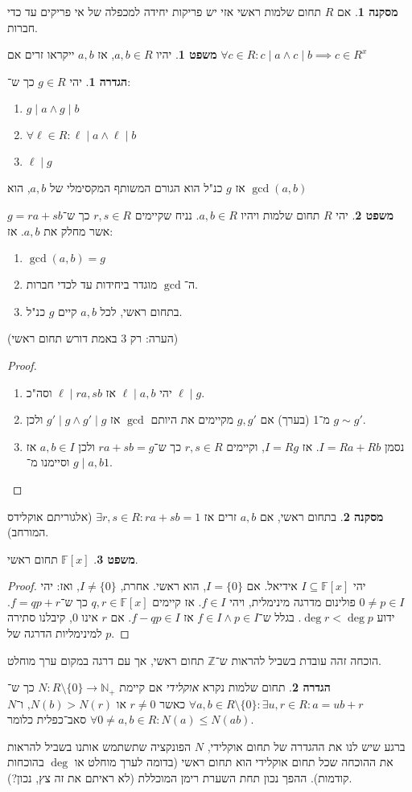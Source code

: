 \documentclass[a4paper]{article}
\newcommand\N     {\mathbb{N}}
\newcommand\Z     {\mathbb{Z}}
\newcommand\ml    {\ell}
\newcommand\F         {\mathbb{F}}
\newcommand\co        {\colon}
\theoremstyle{definition}
\newtheorem{Theorem}{משפט}
\newtheorem{definition}{הגדרה}
\newtheorem{Collary}{מסקנה}
\newcommand\cola [1] {\begin{Collary}#1\end{Collary}}
\newcommand\theo  [1] {\begin{Theorem}#1\end{Theorem}}
\newcommand\defi  [1] {\begin{definition}#1\end{definition}}
\begin{document}
	\cola{אם $R$ תחום שלמות ראשי אזי יש פריקות יחידה למכפלה של אי פריקים עד כדי חברות. }
	
	\theo{יהיו $a, b \in R$, אז $a, b$ ייקראו זרים אם $\forall c \in R\co c \mid a \land c \mid b \implies c \in R^x$}
	\defi{יהי $g \in R$ כך ש־:
		\begin{enumerate}
			\item $g \mid a \land g \mid b$
			\item $\forall \ml \in R \co \ml \mid a \land \ml \mid b$
			\item $\ml \mid g$
		\end{enumerate}
		אז $g$ כנ"ל הוא הגורם המשותף המקסימלי של $a, b$, הוא $\gcd(a, b)$}
	
	\theo{יהי $R$ תחום שלמות ויהיו $a, b \in R$. נניח שקיימים $r, s \in R$ כך ש־$g = ra + sb$ אשר מחלק את $a, b$. אז: 
		\begin{enumerate}
			\item $\gcd(a, b) = g$
			\item ה־$\gcd$ מוגדר ביחידות עד לכדי חברות. 
			\item בתחום ראשי, לכל $a, b$ קיים $g$ כנ"ל. 
	\end{enumerate}}
	(הערה: רק 3 באמת דורש תחום ראשי)
	\begin{proof}\,
		\begin{enumerate}
			\item יהי $\ml \mid a, b$ אז $\ml \mid ra, sb$ וסה"כ $\ml \mid g$. 
			\item מ־1 (בערך) אם $g, g'$ מקיימים את היותם $\gcd$ אז $g' \mid g \land g' \mid g$ ולכן $g \sim g'$. 
			\item נסמן $I = Ra + Rb$. אז $I = Rg$, וקיימים $r, s \in R$ כך ש־$ra + sb = g$ ולכן $a, b \in I$ אז $g \mid a, b$ וסיימנו מ־$1$. 
		\end{enumerate}
	\end{proof}
	\cola{בתחום ראשי, אם $a, b$ זרים אז $\exists r, s \in R\co ra + sb = 1$ (אלגוריתם אוקלידס המורחב). }
	\theo{$\F[x]$ תחום ראשי. }
	\begin{proof}
		יהי $I \subseteq \F[x]$ אידיאל. אם $I = \{0\}$, הוא ראשי. אחרת, $I \neq \{0\}$, ואז: יהי $0 \neq p \in I$ פולינום מדרגה מינימלית, ויהי $f \in I$. אז קיימים $q, r \in \F[x]$ כך ש־$f = qp + r$. ידוע $\deg r < \deg p$. בגלל ש־$f \in I \land p \in I$ אז $f - qp \in I$. אם $r$ אינו $0$, קיבלנו סתירה למינימליות הדרגה של $p$. 
	\end{proof}
	הוכחה זהה עובדת בשביל להראות ש־$\Z$ תחום ראשי, אך עם דרגה במקום ערך מוחלט. 
	
	\defi{תחום שלמות נקרא \textit{אוקלידי} אם קיימת $N \co R \setminus \{0\} \to \N_+$ כך ש־$\forall a, b \in R\setminus \{0\} \co \exists u, r \in R \co a = ub + r$ כאשר $r \neq 0$ או $N(b) > N(r)$, ו־$N$ סאב־כפלית כלומר $\forall 0 \neq a, b \in R \co N(a) \le N(ab)$. }
	ברגע שיש לנו את ההגדרה של תחום אוקלידי, $N$ הפונקציה שתשתמש אותנו בשביל להראות את ההוכחה שכל תחום אוקלידי הוא תחום ראשי (בדומה לערך מוחלט או $\deg$ בהוכחות קודמות). ההפך נכון תחת השערת רימן המוכללת (לא ראיתם את זה צץ, נכון?). 
	
\end{document}
